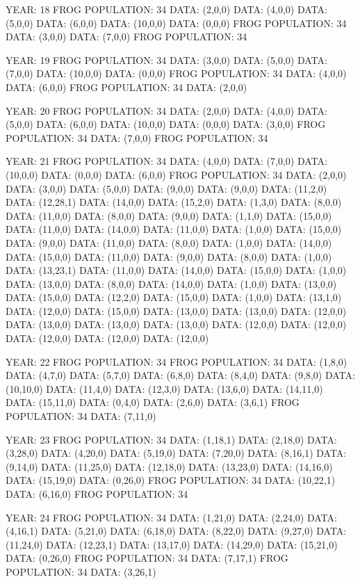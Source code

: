 \documentclass[12pt,a4paper]{article}
\begin{document}
{YEAR: 18
FROG POPULATION: 34
DATA: (2,0,0)
DATA: (4,0,0)
DATA: (5,0,0)
DATA: (6,0,0)
DATA: (10,0,0)
DATA: (0,0,0)
FROG POPULATION: 34
DATA: (3,0,0)
DATA: (7,0,0)
FROG POPULATION: 34

YEAR: 19
FROG POPULATION: 34
DATA: (3,0,0)
DATA: (5,0,0)
DATA: (7,0,0)
DATA: (10,0,0)
DATA: (0,0,0)
FROG POPULATION: 34
DATA: (4,0,0)
DATA: (6,0,0)
FROG POPULATION: 34
DATA: (2,0,0)

YEAR: 20
FROG POPULATION: 34
DATA: (2,0,0)
DATA: (4,0,0)
DATA: (5,0,0)
DATA: (6,0,0)
DATA: (10,0,0)
DATA: (0,0,0)
DATA: (3,0,0)
FROG POPULATION: 34
DATA: (7,0,0)
FROG POPULATION: 34

YEAR: 21
FROG POPULATION: 34
DATA: (4,0,0)
DATA: (7,0,0)
DATA: (10,0,0)
DATA: (0,0,0)
DATA: (6,0,0)
FROG POPULATION: 34
DATA: (2,0,0)
DATA: (3,0,0)
DATA: (5,0,0)
DATA: (9,0,0)
DATA: (9,0,0)
DATA: (11,2,0)
DATA: (12,28,1)
DATA: (14,0,0)
DATA: (15,2,0)
DATA: (1,3,0)
DATA: (8,0,0)
DATA: (11,0,0)
DATA: (8,0,0)
DATA: (9,0,0)
DATA: (1,1,0)
DATA: (15,0,0)
DATA: (11,0,0)
DATA: (14,0,0)
DATA: (11,0,0)
DATA: (1,0,0)
DATA: (15,0,0)
DATA: (9,0,0)
DATA: (11,0,0)
DATA: (8,0,0)
DATA: (1,0,0)
DATA: (14,0,0)
DATA: (15,0,0)
DATA: (11,0,0)
DATA: (9,0,0)
DATA: (8,0,0)
DATA: (1,0,0)
DATA: (13,23,1)
DATA: (11,0,0)
DATA: (14,0,0)
DATA: (15,0,0)
DATA: (1,0,0)
DATA: (13,0,0)
DATA: (8,0,0)
DATA: (14,0,0)
DATA: (1,0,0)
DATA: (13,0,0)
DATA: (15,0,0)
DATA: (12,2,0)
DATA: (15,0,0)
DATA: (1,0,0)
DATA: (13,1,0)
DATA: (12,0,0)
DATA: (15,0,0)
DATA: (13,0,0)
DATA: (13,0,0)
DATA: (12,0,0)
DATA: (13,0,0)
DATA: (13,0,0)
DATA: (13,0,0)
DATA: (12,0,0)
DATA: (12,0,0)
DATA: (12,0,0)
DATA: (12,0,0)
DATA: (12,0,0)

YEAR: 22
FROG POPULATION: 34
FROG POPULATION: 34
DATA: (1,8,0)
DATA: (4,7,0)
DATA: (5,7,0)
DATA: (6,8,0)
DATA: (8,4,0)
DATA: (9,8,0)
DATA: (10,10,0)
DATA: (11,4,0)
DATA: (12,3,0)
DATA: (13,6,0)
DATA: (14,11,0)
DATA: (15,11,0)
DATA: (0,4,0)
DATA: (2,6,0)
DATA: (3,6,1)
FROG POPULATION: 34
DATA: (7,11,0)

YEAR: 23
FROG POPULATION: 34
DATA: (1,18,1)
DATA: (2,18,0)
DATA: (3,28,0)
DATA: (4,20,0)
DATA: (5,19,0)
DATA: (7,20,0)
DATA: (8,16,1)
DATA: (9,14,0)
DATA: (11,25,0)
DATA: (12,18,0)
DATA: (13,23,0)
DATA: (14,16,0)
DATA: (15,19,0)
DATA: (0,26,0)
FROG POPULATION: 34
DATA: (10,22,1)
DATA: (6,16,0)
FROG POPULATION: 34

YEAR: 24
FROG POPULATION: 34
DATA: (1,21,0)
DATA: (2,24,0)
DATA: (4,16,1)
DATA: (5,21,0)
DATA: (6,18,0)
DATA: (8,22,0)
DATA: (9,27,0)
DATA: (11,24,0)
DATA: (12,23,1)
DATA: (13,17,0)
DATA: (14,29,0)
DATA: (15,21,0)
DATA: (0,26,0)
FROG POPULATION: 34
DATA: (7,17,1)
FROG POPULATION: 34
DATA: (3,26,1)

}
\end{document}
